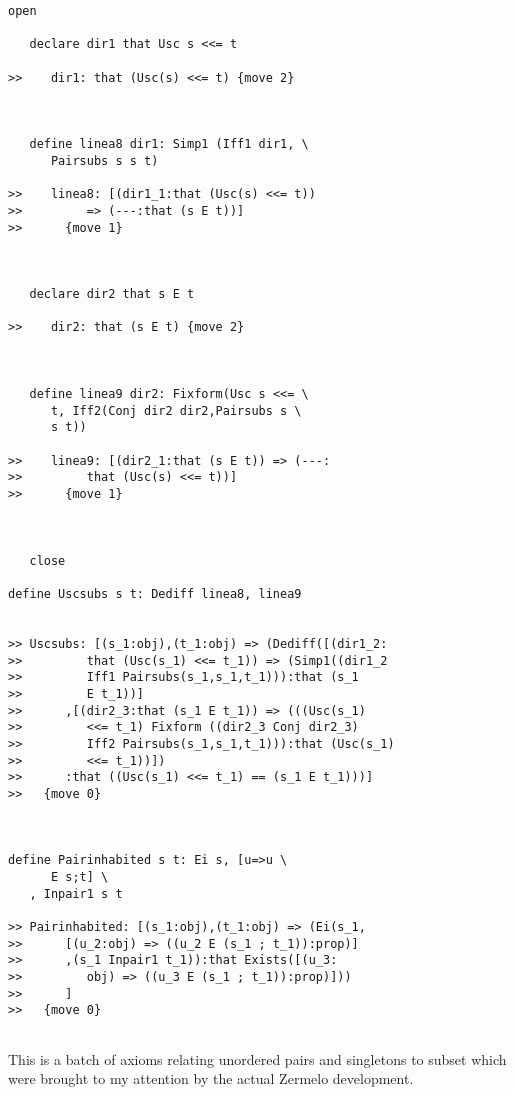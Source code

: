 \documentclass[12pt]{article}
\begin{document}
\begin{verbatim}
open

   declare dir1 that Usc s <<= t

>>    dir1: that (Usc(s) <<= t) {move 2}



   define linea8 dir1: Simp1 (Iff1 dir1, \
      Pairsubs s s t)

>>    linea8: [(dir1_1:that (Usc(s) <<= t))
>>         => (---:that (s E t))]
>>      {move 1}



   declare dir2 that s E t

>>    dir2: that (s E t) {move 2}



   define linea9 dir2: Fixform(Usc s <<= \
      t, Iff2(Conj dir2 dir2,Pairsubs s \
      s t))

>>    linea9: [(dir2_1:that (s E t)) => (---:
>>         that (Usc(s) <<= t))]
>>      {move 1}



   close

define Uscsubs s t: Dediff linea8, linea9


>> Uscsubs: [(s_1:obj),(t_1:obj) => (Dediff([(dir1_2:
>>         that (Usc(s_1) <<= t_1)) => (Simp1((dir1_2
>>         Iff1 Pairsubs(s_1,s_1,t_1))):that (s_1
>>         E t_1))]
>>      ,[(dir2_3:that (s_1 E t_1)) => (((Usc(s_1)
>>         <<= t_1) Fixform ((dir2_3 Conj dir2_3)
>>         Iff2 Pairsubs(s_1,s_1,t_1))):that (Usc(s_1)
>>         <<= t_1))])
>>      :that ((Usc(s_1) <<= t_1) == (s_1 E t_1)))]
>>   {move 0}



define Pairinhabited s t: Ei s, [u=>u \
      E s;t] \
   , Inpair1 s t

>> Pairinhabited: [(s_1:obj),(t_1:obj) => (Ei(s_1,
>>      [(u_2:obj) => ((u_2 E (s_1 ; t_1)):prop)]
>>      ,(s_1 Inpair1 t_1)):that Exists([(u_3:
>>         obj) => ((u_3 E (s_1 ; t_1)):prop)]))
>>      ]
>>   {move 0}


\end{verbatim}

This is a batch of axioms relating unordered pairs and singletons to subset which were brought to my attention by the actual Zermelo development.
\end{document}
